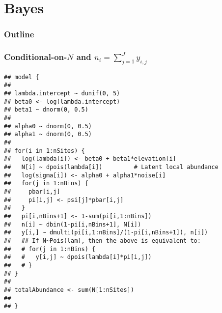 \documentclass[color=usenames,dvipsnames]{beamer}\usepackage[]{graphicx}\usepackage[]{color}
\makeatletter
\newenvironment{kframe}{%
 \def\at@end@of@kframe{}%
 \ifinner\ifhmode%
  \def\at@end@of@kframe{\end{minipage}}%
  \begin{minipage}{\columnwidth}%
 \fi\fi%
 \def\FrameCommand##1{\hskip\@totalleftmargin \hskip-\fboxsep
 \colorbox{shadecolor}{##1}\hskip-\fboxsep
     \hskip-\linewidth \hskip-\@totalleftmargin \hskip\columnwidth}%
 \MakeFramed {\advance\hsize-\width
   \@totalleftmargin\z@ \linewidth\hsize
   \@setminipage}}%
 {\par\unskip\endMakeFramed%
 \at@end@of@kframe}
\newenvironment{knitrout}{}{} %
\makeatother
\begin{document}







\section{Bayes}


\begin{frame}
  \frametitle{Outline}
  \Large
\end{frame}





\begin{frame}[fragile]
  \frametitle{\normalsize Conditional-on-$N$ and $n_i=\sum_{j=1}^{J} y_{i,j}$}
\vspace{-3pt}
\begin{knitrout}\tiny
{}\color{fgcolor}\begin{kframe}
\begin{verbatim}
## model {
## 
## lambda.intercept ~ dunif(0, 5)
## beta0 <- log(lambda.intercept)
## beta1 ~ dnorm(0, 0.5)
## 
## alpha0 ~ dnorm(0, 0.5)  
## alpha1 ~ dnorm(0, 0.5)
## 
## for(i in 1:nSites) {
##   log(lambda[i]) <- beta0 + beta1*elevation[i]
##   N[i] ~ dpois(lambda[i])         # Latent local abundance
##   log(sigma[i]) <- alpha0 + alpha1*noise[i]
##   for(j in 1:nBins) {
##     pbar[i,j]
##     pi[i,j] <- psi[j]*pbar[i,j]
##   }
##   pi[i,nBins+1] <- 1-sum(pi[i,1:nBins])
##   n[i] ~ dbin(1-pi[i,nBins+1], N[i])
##   y[i,] ~ dmulti(pi[i,1:nBins]/(1-pi[i,nBins+1]), n[i])
##   ## If N~Pois(lam), then the above is equivalent to:
##   # for(j in 1:nBins) {
##   #   y[i,j] ~ dpois(lambda[i]*pi[i,j])
##   # }
## }
## 
## totalAbundance <- sum(N[1:nSites])
## 
## }
\end{verbatim}
\end{kframe}
\end{knitrout}
\end{frame}
\end{document}
